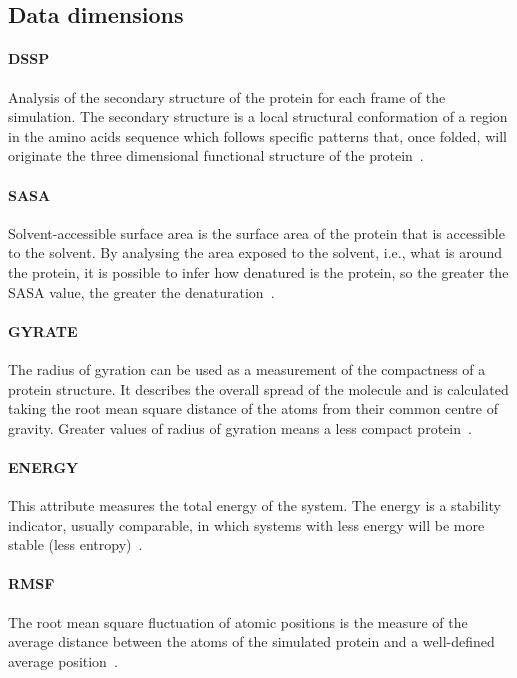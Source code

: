 \documentclass[10pt, conference]{IEEEtran}
\begin{document}
\subsection{Data dimensions}

\paragraph*{DSSP} Analysis of the secondary structure of the protein for each frame of the simulation. The secondary structure is a local structural conformation of a region in the amino acids sequence which follows specific patterns that, once folded, will originate the three dimensional functional structure of the protein~\cite{kabsch1983dictionary}. 
%

\paragraph*{SASA} Solvent-accessible surface area is the surface area of the protein that is accessible to the solvent. By analysing the area exposed to the solvent, i.e., what is around the protein, it is possible to infer how denatured is the protein, so the greater the SASA value, the greater the denaturation~\cite{richmond1984solvent}.
%

\paragraph*{GYRATE} The radius of gyration can be used as a measurement of the compactness of a protein structure. It describes the overall spread of the molecule and is calculated taking the root mean square distance of the atoms from their common centre of gravity. Greater values of radius of gyration means a less compact protein~\cite{lobanov2008radius}.
%

\paragraph*{ENERGY} This attribute measures the total energy of the system. The energy is a stability indicator, usually comparable, in which systems with less energy will be more stable (less entropy)~\cite{van1998gromos}.
%

\paragraph*{RMSF} The root mean square fluctuation of atomic positions is the measure of the average distance between the atoms of the simulated protein and a well-defined average position~\cite{maiorov1994significance}. 
%
\end{document}
